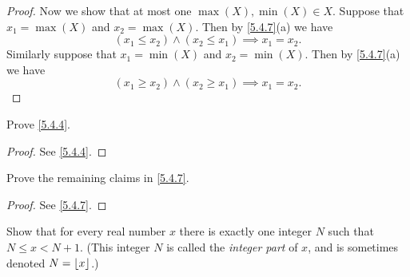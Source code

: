 \begin{proof}
	Now we show that at most one \(\max(X), \min(X) \in X\).
	Suppose that \(x_1 = \max(X)\) and \(x_2 = \max(X)\).
	Then by \cref{5.4.7}(a) we have
	\[
		(x_1 \leq x_2) \land (x_2 \leq x_1) \implies x_1 = x_2.
	\]
	Similarly suppose that \(x_1 = \min(X)\) and \(x_2 = \min(X)\).
	Then by \cref{5.4.7}(a) we have
	\[
		(x_1 \geq x_2) \land (x_2 \geq x_1) \implies x_1 = x_2.
	\]
\end{proof}

\exercisesection

\begin{ex}\label{ex:5.4.1}
	Prove \cref{5.4.4}.
\end{ex}

\begin{proof}
	See \cref{5.4.4}.
\end{proof}

\begin{ex}\label{ex:5.4.2}
	Prove the remaining claims in \cref{5.4.7}.
\end{ex}

\begin{proof}
	See \cref{5.4.7}.
\end{proof}

\begin{ex}\label{ex:5.4.3}
	Show that for every real number \(x\) there is exactly one integer \(N\) such that \(N \leq x < N + 1\).
	(This integer \(N\) is called the \emph{integer part} of \(x\), and is sometimes denoted \(N = \left\lfloor x\right\rfloor\).)
\end{ex}

